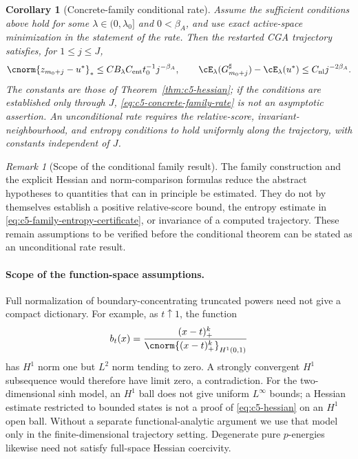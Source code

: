 \documentclass[11pt]{article}
\newtheorem{corollary}[theorem]{Corollary}
\theoremstyle{remark}
\newtheorem{remark}[theorem]{Remark}
\begin{document}
\begin{corollary}[Concrete-family conditional rate]
\label{cor:c5-concrete-family}
Assume the sufficient conditions above hold for some $\lambda\in(0,\lambda_0]$
and $0<\beta_A$, and use exact active-space minimization in the statement
of the rate.  Then the restarted CGA trajectory satisfies, for
$1\leq j\leq J$,
\begin{equation}
 \cnorm{z_{m_0+j}-u^*}_*
   \leq C B_\lambda C_{\rm ent}t_0^{-1}j^{-\beta_A},
 \qquad
 \cE_\lambda(G_{m_0+j}^\sharp)-\cE_\lambda(u^*)
   \leq C_{\rm nl}j^{-2\beta_A}.
 \label{eq:c5-concrete-family-rate}
\end{equation}
The constants are those of Theorem~\ref{thm:c5-hessian}; if the conditions
are established only through $J$, \eqref{eq:c5-concrete-family-rate} is not an
asymptotic assertion. An unconditional rate requires the relative-score,
invariant-neighbourhood, and entropy conditions to hold uniformly along the trajectory,
with constants independent of $J$.
\end{corollary}

\begin{remark}[Scope of the conditional family result]
The family construction and the explicit Hessian and norm-comparison formulas reduce
the abstract hypotheses to quantities that can in principle be estimated. They do not
by themselves establish a positive relative-score bound, the entropy estimate in
\eqref{eq:c5-family-entropy-certificate}, or invariance of a computed trajectory.
These remain assumptions to be verified before the conditional theorem can be stated
as an unconditional rate result.
\end{remark}

\paragraph{Scope of the function-space assumptions.}
Full normalization of boundary-concentrating truncated powers need not
give a compact dictionary. For example, as $t\uparrow1$, the function
\[
 b_t(x)=\frac{(x-t)_+^k}{\cnorm{(x-t)_+^k}_{H^1(0,1)}}
\]
has $H^1$ norm one
but $L^2$ norm tending to zero. A strongly convergent $H^1$ subsequence
would therefore have limit zero, a contradiction.
For the two-dimensional sinh model, an $H^1$ ball does not give
uniform $L^\infty$ bounds; a Hessian estimate restricted to bounded
states is not a proof of \eqref{eq:c5-hessian} on an $H^1$ open ball.
Without a separate functional-analytic argument we use that model only
in the finite-dimensional trajectory setting. Degenerate pure $p$-energies
likewise need not satisfy full-space Hessian coercivity.
\end{document}
